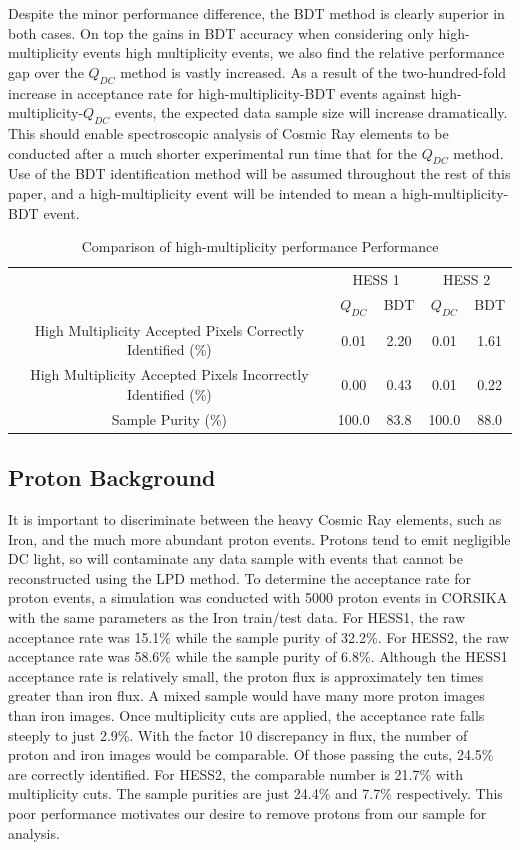 \documentclass[11pt]{article}
\begin{document}
Despite the minor performance difference, the BDT method is clearly superior in both cases. On top the gains in BDT accuracy when considering only high-multiplicity events high multiplicity events, we also find the relative performance gap over the $Q_{DC}$ method is vastly increased. As a result of the two-hundred-fold increase in acceptance rate for high-multiplicity-BDT events against high-multiplicity-$Q_{DC}$ events, the expected data sample size will increase dramatically. This should enable spectroscopic analysis of Cosmic Ray elements to be conducted after a much shorter experimental run time that for the $Q_{DC}$ method. Use of the BDT identification method will be assumed throughout the rest of this paper, and a high-multiplicity event will be intended to mean a high-multiplicity-BDT event.

\begin{table}[h!]
  \centering
  \caption{Comparison of high-multiplicity performance Performance}
  \label{tab:highmultiplicitycomparison}
  \begin{tabular}{c|cc|cc}
    \toprule
    & \multicolumn{2}{c|}{HESS 1} & \multicolumn{2}{c}{HESS 2} \\
    & $Q_{DC}$ & BDT & $Q_{DC}$ & BDT\\
    \midrule
    High Multiplicity Accepted Pixels Correctly Identified (\%)& 0.01 & 2.20 & 0.01 & 1.61\\
    High Multiplicity Accepted Pixels Incorrectly Identified (\%)  & 0.00 & 0.43 & 0.01 & 0.22\\
    Sample Purity (\%)& 100.0 & 83.8 & 100.0 & 88.0\\
    \bottomrule
  \end{tabular}
\end{table}

\subsection{Proton Background}
It is important to discriminate between the heavy Cosmic Ray elements, such as Iron, and the much more abundant proton events. Protons tend to emit negligible DC light, so will contaminate any data sample with events that cannot be reconstructed using the LPD method. To determine the acceptance rate for proton events, a simulation was conducted with 5000 proton events in CORSIKA with the same parameters as the Iron train/test data. For HESS1, the raw acceptance rate was 15.1\% while the sample purity of 32.2\%. For HESS2, the raw acceptance rate was 58.6\% while the sample purity of 6.8\%. Although the HESS1 acceptance rate is relatively small, the proton flux is approximately ten times greater than iron flux. A mixed sample would have many more proton images than iron images. Once multiplicity cuts are applied, the acceptance rate falls steeply to just 2.9\%. With the factor 10 discrepancy in flux, the number of proton and iron images would be comparable. Of those passing the cuts, 24.5\% are correctly identified.  For HESS2, the comparable number is 21.7\% with multiplicity cuts. The sample purities are just 24.4\% and 7.7\% respectively. This poor performance motivates our desire to remove protons from our sample for analysis.
\end{document}
